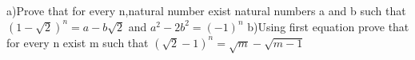 a)Prove that for every n,natural number exist natural numbers a and b such that
$(1-\sqrt{2})^n=a-b\sqrt{2}$ and $a^2-2b^2=(-1)^n$
b)Using first equation prove that for every n exist m such that
$(\sqrt{2}-1)^n=\sqrt{m}-\sqrt{m-1}$